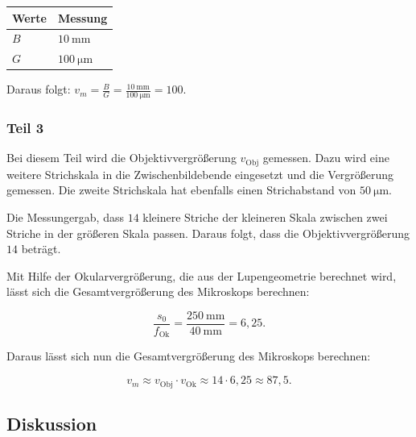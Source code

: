             \begin{table}[h]
                \begin{center}
                    \begin{tabular}{|l|l|}
                        \hline
                        Werte & Messung\\
                        \hline
                        $B$ & $10\ \mathrm{mm}$\\
                        $G$ & $100\ \mathrm{\mu m}$\\
                        \hline
                    \end{tabular}
                \end{center}
            \end{table}

            Daraus folgt: $v_{m} = \frac{B}{G} = \frac{10\ \mathrm{mm}}{100\ \mathrm{\mu m}} = 100$.
        
        \subsubsection{Teil 3}
            
            Bei diesem Teil wird die Objektivvergrößerung $v_{\mathrm{Obj}}$ gemessen. Dazu wird eine weitere Strichskala in die Zwischenbildebende eingesetzt und die Vergrößerung gemessen. Die zweite Strichskala hat ebenfalls einen Strichabstand von $50\ \mathrm{\mu m}$.

            Die \glqq Messung\grqq ergab, dass $14$ kleinere Striche der kleineren Skala zwischen zwei Striche in der größeren Skala passen. Daraus folgt, dass die Objektivvergrößerung $14$ beträgt.

            Mit Hilfe der Okularvergrößerung, die aus der Lupengeometrie berechnet wird, lässt sich die Gesamtvergrößerung des Mikroskops berechnen:

            $$\frac{s_{0}}{f_{\mathrm{Ok}}} = \frac{250\ \mathrm{mm}}{40\ \mathrm{mm}} = 6,25.$$

            Daraus lässt sich nun die Gesamtvergrößerung des Mikroskops berechnen:

            $$v_{m} \approx v_{\mathrm{Obj}} \cdot v_{\mathrm{Ok}} \approx 14 \cdot 6,25 \approx 87,5.$$

    \subsection{Diskussion}
        
